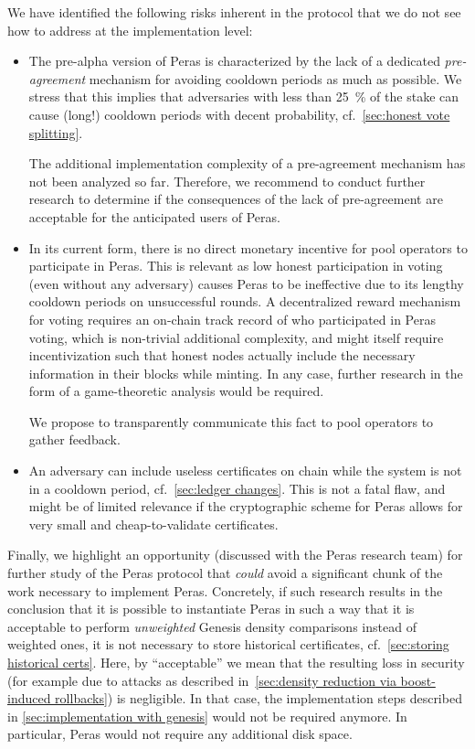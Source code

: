 We have identified the following risks inherent in the protocol that we do not see how to address at the implementation level:
\begin{itemize}
\item
  The pre-alpha version of Peras is characterized by the lack of a dedicated \emph{pre-agreement} mechanism for avoiding cooldown periods as much as possible.
  We stress that this implies that adversaries with less than \qty{25}{\percent} of the stake can cause (long!) cooldown periods with decent probability, cf.~\cref{sec:honest vote splitting}.

  The additional implementation complexity of a pre-agreement mechanism has not been analyzed so far.
  Therefore, we recommend to conduct further research to determine if the consequences of the lack of pre-agreement are acceptable for the anticipated users of Peras.
\item
  In its current form, there is no direct monetary incentive for pool operators to participate in Peras.
  This is relevant as low honest participation in voting (even without any adversary) causes Peras to be ineffective due to its lengthy cooldown periods on unsuccessful rounds.
  A decentralized reward mechanism for voting requires an on-chain track record of who participated in Peras voting, which is non-trivial additional complexity, and might itself require incentivization such that honest nodes actually include the necessary information in their blocks while minting.
  In any case, further research in the form of a game-theoretic analysis would be required.

  We propose to transparently communicate this fact to pool operators to gather feedback.
\item
  An adversary can include useless certificates on chain while the system is not in a cooldown period, cf.~\cref{sec:ledger changes}.
  This is not a fatal flaw, and might be of limited relevance if the cryptographic scheme for Peras allows for very small and cheap-to-validate certificates.
\end{itemize}

Finally, we highlight an opportunity (discussed with the Peras research team) for further study of the Peras protocol that \emph{could} avoid a significant chunk of the work necessary to implement Peras.
Concretely, if such research results in the conclusion that it is possible to instantiate Peras in such a way that it is acceptable to perform \emph{unweighted} Genesis density comparisons instead of weighted ones, it is not necessary to store historical certificates, cf.~\cref{sec:storing historical certs}.
Here, by \enquote{acceptable} we mean that the resulting loss in security (for example due to attacks as described in~\cref{sec:density reduction via boost-induced rollbacks}) is negligible.
In that case, the implementation steps described in \cref{sec:implementation with genesis} would not be required anymore.
In particular, Peras would not require any additional disk space.

